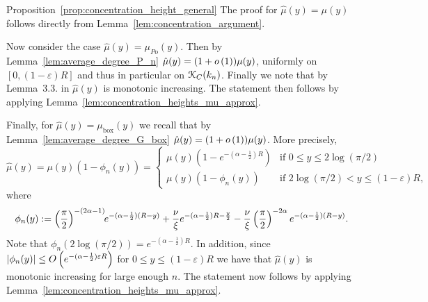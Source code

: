 \begin{appendices}
\begin{proofof}{Proposition~\ref{prop:concentration_height_general}}
The proof for $\hat{\mu}(y) = \mu(y)$ follows directly from Lemma~\ref{lem:concentration_argument}.

Now consider the case $\hat{\mu}(y) = \mu_{Po}(y)$. Then by Lemma~\ref{lem:average_degree_P_n} $\hat{\mu}(y) = (1+o\left(1\right)) \mu(y)$, uniformly on $[0,(1-\varepsilon)R]$ and thus in particular on ${\mathcal K}_C(k_n)$. Finally we note that by Lemma~3.3. in \cite{gugelmann2012random} $\hat{\mu}(y)$ is monotonic increasing. The statement then follows by applying Lemma~\ref{lem:concentration_heights_mu_approx}.

Finally, for $\hat{\mu}(y) = \mu_{\mathrm{box}}(y)$ we recall that by Lemma~\ref{lem:average_degree_G_box} $\hat{\mu}(y) = (1+o\left(1\right))\mu(y)$. More precisely,
\[
	\hat{\mu}(y) = \mu(y)(1-\phi_n(y)) = \begin{cases}
		\mu(y)\left(1 - e^{-(\alpha-\frac{1}{2})R}\right) &\mbox{if } 0 \le y \le 2\log(\pi/2) \\
		\mu(y)\left(1 - \phi_n(y)\right) &\mbox{if } 2\log(\pi/2) < y \le (1-\varepsilon)R,
	\end{cases}
\]
where
\[
	\phi_n(y) :=  \left(\frac{\pi}{2}\right)^{-(2\alpha - 1)} \hspace{-3pt} e^{-(\alpha - \frac{1}{2})(R - y)}
				+ \frac{\nu}{\xi}e^{-(\alpha - \frac{1}{2})R - \frac{y}{2}} - \frac{\nu}{\xi}\left(\frac{\pi}{2}\right)^{-2\alpha} e^{-(\alpha-\frac{1}{2})(R - y)}.
\]
Note that $\phi_n(2\log(\pi/2)) = e^{-(\alpha-\frac{1}{2})R}$. In addition, since $|\phi_n(y)| \le O\left(e^{-(\alpha-\frac{1}{2})\varepsilon R}\right)$ for $0 \le y \le (1-\varepsilon)R$ we have that $\hat{\mu}(y)$ is monotonic increasing for large enough $n$. The statement now follows by applying Lemma~\ref{lem:concentration_heights_mu_approx}.
\end{proofof}


\end{appendices}
